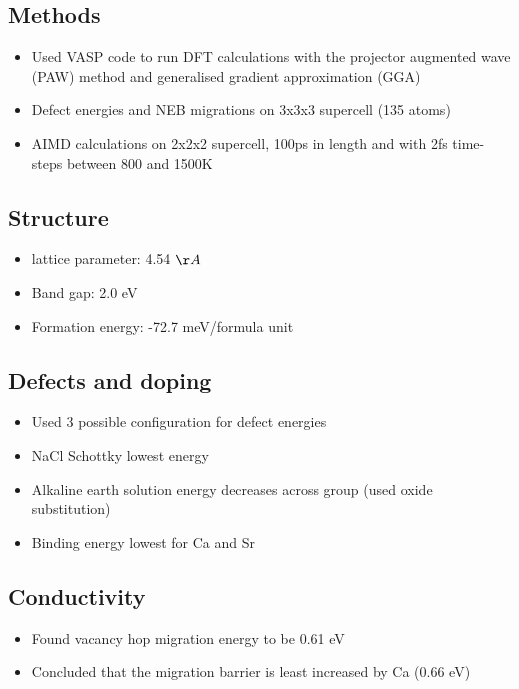 \documentclass[10pt,a4paper, titlepage]{article}
\begin{document}
\subsection{Methods}

\begin{itemize}
  \item Used VASP code to run DFT calculations with the projector augmented wave (PAW) method and generalised gradient approximation (GGA)
  \item Defect energies and NEB migrations on 3x3x3 supercell (135 atoms)
  \item AIMD calculations on 2x2x2 supercell, 100ps in length and with 2fs time-steps between 800 and 1500K
\end{itemize}

\subsection{Structure}

\begin{itemize}
  \item {} lattice parameter: 4.54 $\AA$
  \item Band gap: 2.0 eV
  \item Formation energy: -72.7 meV/formula unit
\end{itemize}

\subsection{Defects and doping}

\begin{itemize}
  \item Used 3 possible configuration for defect energies
  \item NaCl Schottky lowest energy
  \item Alkaline earth solution energy decreases across group (used oxide substitution)
  \item Binding energy lowest for Ca and Sr
\end{itemize}

\subsection{Conductivity}

\begin{itemize}
  \item Found vacancy hop migration energy to be 0.61 eV
  \item Concluded that the migration barrier is least increased by Ca (0.66 eV)
\end{itemize}
\end{document}
